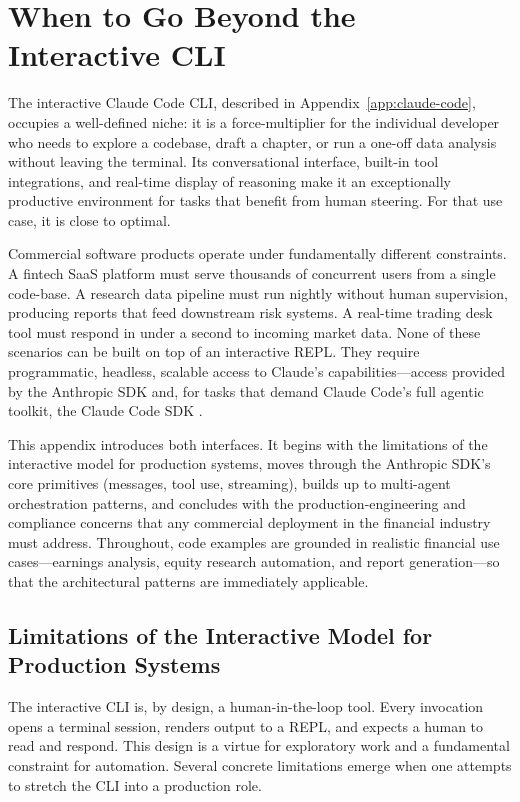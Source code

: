 \section{When to Go Beyond the Interactive CLI}
\label{app:sdk-commercial:motivation}

The interactive Claude Code CLI, described in Appendix~\ref{app:claude-code}, occupies
a well-defined niche: it is a force-multiplier for the individual developer who needs to
explore a codebase, draft a chapter, or run a one-off data analysis without leaving the
terminal. Its conversational interface, built-in tool integrations, and real-time display
of reasoning make it an exceptionally productive environment for tasks that benefit from
human steering. For that use case, it is close to optimal.

Commercial software products operate under fundamentally different constraints. A fintech
SaaS platform must serve thousands of concurrent users from a single code-base. A research
data pipeline must run nightly without human supervision, producing reports that feed
downstream risk systems. A real-time trading desk tool must respond in under a second to
incoming market data. None of these scenarios can be built on top of an interactive REPL.
They require programmatic, headless, scalable access to Claude's capabilities---access
provided by the Anthropic SDK and, for tasks that demand Claude Code's full agentic
toolkit, the Claude Code SDK \citep{anthropic2025api, anthropic2025ccsdk}.

This appendix introduces both interfaces. It begins with the limitations of the
interactive model for production systems, moves through the Anthropic SDK's core
primitives (messages, tool use, streaming), builds up to multi-agent orchestration
patterns, and concludes with the production-engineering and compliance concerns that any
commercial deployment in the financial industry must address. Throughout, code examples
are grounded in realistic financial use cases---earnings analysis, equity research
automation, and report generation---so that the architectural patterns are immediately
applicable.

\subsection{Limitations of the Interactive Model for Production Systems}
\label{app:sdk-commercial:motivation:limits}

The interactive CLI is, by design, a human-in-the-loop tool. Every invocation opens a
terminal session, renders output to a REPL, and expects a human to read and respond.
This design is a virtue for exploratory work and a fundamental constraint for
automation. Several concrete limitations emerge when one attempts to stretch the CLI
into a production role.

